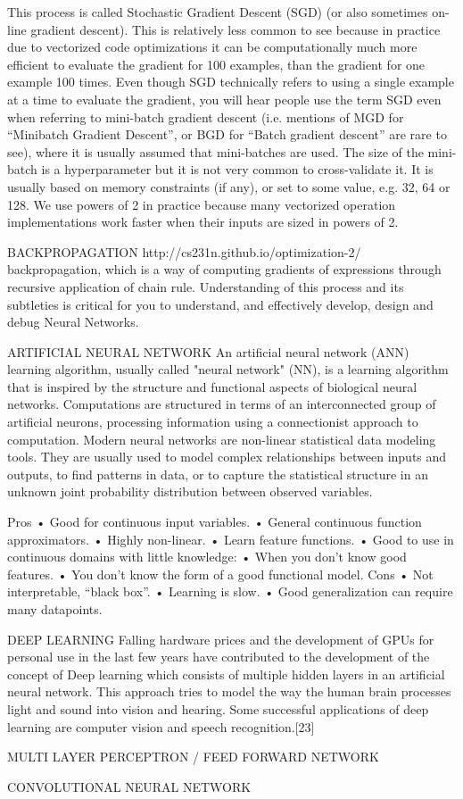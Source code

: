This process is called Stochastic Gradient Descent (SGD) (or also sometimes on-line gradient descent). 
This is relatively less common to see because in practice due to vectorized code optimizations it can be computationally much more efficient to evaluate the gradient for 100 examples,
than the gradient for one example 100 times. Even though SGD technically refers to using a single example at a time to evaluate the gradient, 
you will hear people use the term SGD even when referring to mini-batch gradient descent (i.e. mentions of MGD for “Minibatch Gradient Descent”, 
or BGD for “Batch gradient descent” are rare to see), where it is usually assumed that mini-batches are used. 
The size of the mini-batch is a hyperparameter but it is not very common to cross-validate it. 
It is usually based on memory constraints (if any), or set to some value, e.g. 32, 64 or 128. We use powers of 2 in practice because many vectorized operation implementations work 
faster when their inputs are sized in powers of 2.


BACKPROPAGATION
http://cs231n.github.io/optimization-2/
backpropagation, which is a way of computing gradients of expressions through recursive application of chain rule. 
Understanding of this process and its subtleties is critical for you to understand, and effectively develop, design and debug Neural Networks.

ARTIFICIAL NEURAL NETWORK
An artificial neural network (ANN) learning algorithm, usually called "neural network" (NN), is a learning algorithm that is inspired by the structure and functional aspects 
of biological neural networks. Computations are structured in terms of an interconnected group of artificial neurons, processing information using a connectionist approach 
to computation. Modern neural networks are non-linear statistical data modeling tools. They are usually used to model complex relationships between inputs and outputs, 
to find patterns in data, or to capture the statistical structure in an unknown joint probability distribution between observed variables.

Pros
• Good for continuous input variables.
• General continuous function approximators.
• Highly non-linear.
• Learn feature functions.
• Good to use in continuous domains with little knowledge:
• When you don’t know good features.
• You don’t know the form of a good functional model.
Cons
• Not interpretable, “black box”.
• Learning is slow.
• Good generalization can require many datapoints.

DEEP LEARNING
Falling hardware prices and the development of GPUs for personal use in the last few years have contributed to the development of the concept of Deep learning which consists 
of multiple hidden layers in an artificial neural network. This approach tries to model the way the human brain processes light and sound into vision and hearing. 
Some successful applications of deep learning are computer vision and speech recognition.[23]



MULTI LAYER PERCEPTRON / FEED FORWARD NETWORK

CONVOLUTIONAL NEURAL NETWORK